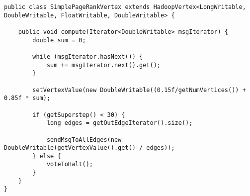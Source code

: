 \begin{lstlisting}
public class SimplePageRankVertex extends HadoopVertex<LongWritable, DoubleWritable, FloatWritable, DoubleWritable> {

	public void compute(Iterator<DoubleWritable> msgIterator) {
		double sum = 0;
		
		while (msgIterator.hasNext()) {
			sum += msgIterator.next().get();
		}
		
		setVertexValue(new DoubleWritable((0.15f/getNumVertices()) + 0.85f * sum);
		
		if (getSuperstep() < 30) {
			long edges = getOutEdgeIterator().size();
			
			sendMsgToAllEdges(new DoubleWritable(getVertexValue().get() / edges));
		} else {
			voteToHalt();
		}
	}
}					
\end{lstlisting}